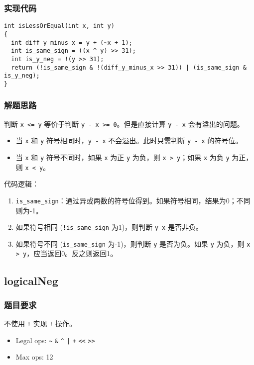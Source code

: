 \documentclass{article}
\begin{document}
\subsubsection{实现代码}
\begin{lstlisting}[caption={isLessOrEqual}]
int isLessOrEqual(int x, int y)
{
  int diff_y_minus_x = y + (~x + 1);
  int is_same_sign = ((x ^ y) >> 31);
  int is_y_neg = !(y >> 31);
  return (!is_same_sign & !(diff_y_minus_x >> 31)) | (is_same_sign & is_y_neg);
}
\end{lstlisting}

\subsubsection{解题思路}
判断 \texttt{x <= y} 等价于判断 \texttt{y - x >= 0}。但是直接计算 \texttt{y - x} 会有溢出的问题。
\begin{itemize}
    \item 当 \texttt{x} 和 \texttt{y} 符号相同时，\texttt{y - x} 不会溢出。此时只需判断 \texttt{y - x} 的符号位。
    \item 当 \texttt{x} 和 \texttt{y} 符号不同时，如果 \texttt{x} 为正 \texttt{y} 为负，则 \texttt{x > y}；如果 \texttt{x} 为负 \texttt{y} 为正，则 \texttt{x < y}。
\end{itemize}
代码逻辑：
\begin{enumerate}
    \item \texttt{is\_same\_sign}：通过异或两数的符号位得到。如果符号相同，结果为0；不同则为-1。
    \item 如果符号相同 (\texttt{!is\_same\_sign} 为1)，则判断 \texttt{y-x} 是否非负。
    \item 如果符号不同 (\texttt{is\_same\_sign} 为-1)，则判断 \texttt{y} 是否为负。如果 \texttt{y} 为负，则 \texttt{x > y}，应当返回0。反之则返回1。
\end{enumerate}

\subsection{logicalNeg}
\subsubsection{题目要求}
不使用 \texttt{!} 实现 \texttt{!} 操作。
\begin{itemize}
    \item Legal ops: \texttt{\~{}} \texttt{\&} \texttt{\^{}} \texttt{|} \texttt{+} \texttt{<<} \texttt{>>}
    \item Max ops: 12
\end{itemize}
\end{document}
